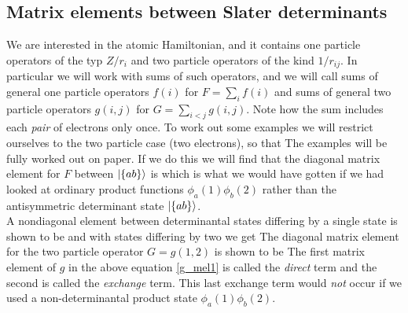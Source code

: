 \subsection{Matrix elements between Slater determinants}
We are interested in the atomic Hamiltonian, and it contains one particle operators of the typ $Z/r_i$ and two particle operators of the kind $1/r_{ij}$. In particular we will work with sums of such operators, and we will call sums of general one particle operators $f(i)$ for $F = \sum_i f(i)$ and sums of general two particle operators $g(i,j)$ for $G = \sum_{i < j} g(i,j)$. Note how the sum includes each \emph{pair} of electrons only once. To work out some examples we will restrict ourselves to the two particle case (two electrons), so that
The examples will be fully worked out on paper. If we do this we will find that the diagonal matrix element for $F$ between $\ket{\{ab\}}$ is
which is what we would have gotten if we had looked at ordinary product functions $\phi_a(1)\phi_b(2)$ rather than the antisymmetric determinant state $\ket{\{ab\}}$.\\
\indent A nondiagonal element between determinantal states differing by a single state is shown to be
and with states differing by two we get
The diagonal matrix element for the two particle operator $G = g(1,2)$ is shown to be
The first matrix element of $g$ in the above equation \eqref{g_mel1} is called the \emph{direct} term and the second is called the \emph{exchange} term. This last exchange term would \emph{not} occur if we used a non-determinantal product state $\phi_a(1)\phi_b(2)$.



